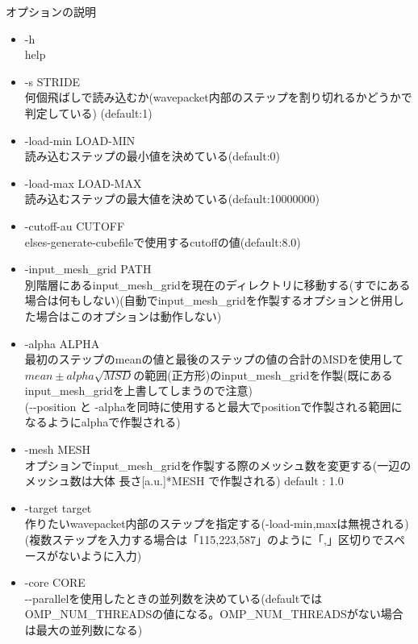 \documentclass{jsarticle}
\begin{document}
オプションの説明\\
\begin{itemize}
\item -h\\
help\\
\item -s STRIDE\\
何個飛ばしで読み込むか(wavepacket内部のステップを割り切れるかどうかで判定している) (default:1)\\
\item -load-min LOAD-MIN\\
読み込むステップの最小値を決めている(default:0)\\
\item -load-max LOAD-MAX\\
読み込むステップの最大値を決めている(default:10000000)\\
\item -cutoff-au CUTOFF\\
elses-generate-cubefileで使用するcutoffの値(default:8.0)\\
\item -input\_mesh\_grid PATH\\
別階層にあるinput\_mesh\_gridを現在のディレクトリに移動する(すでにある場合は何もしない)(自動でinput\_mesh\_gridを作製するオプションと併用した場合はこのオプションは動作しない)\\
\item -alpha ALPHA\\
最初のステップのmeanの値と最後のステップの値の合計のMSDを使用して$mean \pm alpha\sqrt{MSD}$の範囲(正方形)のinput\_mesh\_gridを作製(既にあるinput\_mesh\_gridを上書してしまうので注意)\\
(-\--position と -alphaを同時に使用すると最大でpositionで作製される範囲になるようにalphaで作製される)\\
\item -mesh MESH\\
オプションでinput\_mesh\_gridを作製する際のメッシュ数を変更する(一辺のメッシュ数は大体 長さ[a.u.]*MESH で作製される) default : 1.0\\
\item -target target\\
作りたいwavepacket内部のステップを指定する(-load-min,maxは無視される)(複数ステップを入力する場合は「115,223,587」のように「,」区切りでスペースがないように入力)\\
\item -core CORE\\
-\--parallelを使用したときの並列数を決めている(defaultではOMP\_NUM\_THREADSの値になる。OMP\_NUM\_THREADSがない場合は最大の並列数になる)\\

\end{itemize}
\end{document}
